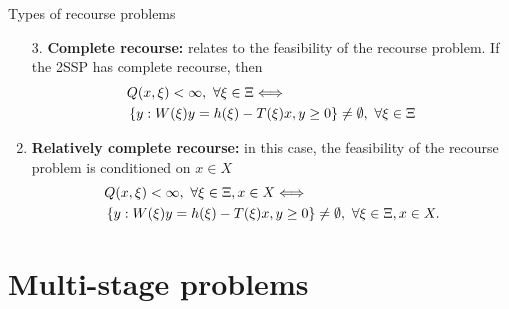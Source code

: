 \begin{frame}{Types of recourse problems}
	
	\begin{enumerate}[<+->]
		\item[3.] {\bf Complete recourse:} relates to the \alert{feasibility} of the recourse problem. If the 2SSP has complete recourse, then
		\begin{align*}
			& Q(x,\xi) < \infty, \ \forall \xi \in \Xi \Longleftrightarrow \\
			& \left\{ y : W(\xi)y = h(\xi) - T(\xi)x, y \ge 0 \right \} \neq \emptyset, \ \forall \xi \in \Xi 
		\end{align*}
	    \item {\bf Relatively complete recourse:} in this case, the feasibility of the recourse problem is \alert{conditioned} on $x \in X$
		\begin{align*}
			& Q(x,\xi) < \infty, \ \forall \xi \in \Xi, x \in X \Longleftrightarrow \\
			& \left\{ y : W(\xi)y = h(\xi) - T(\xi)x, y \ge 0 \right \} \neq \emptyset, \ \forall \xi \in \Xi, x \in X. 
		\end{align*}
	\end{enumerate}

	
\end{frame}


\section{Multi-stage problems}


